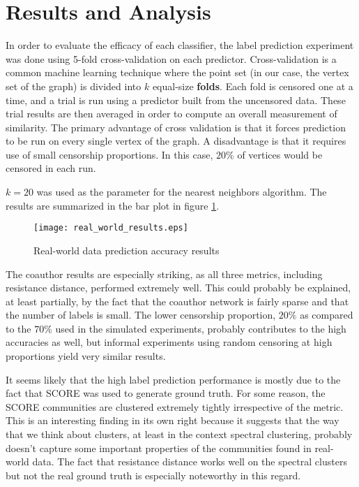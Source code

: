 \section{Results and Analysis}

In order to evaluate the efficacy of each classifier, the label prediction experiment was done using
5-fold cross-validation on each predictor. Cross-validation is a common machine learning technique
where the point set (in our case, the vertex set of the graph) is divided into $k$ equal-size
\textbf{folds}. Each fold is censored one at a time, and a trial is run using a predictor built from
the uncensored data. These trial results are then averaged in order to compute an overall
measurement of similarity. The primary advantage of cross validation is that it forces prediction to
be run on every single vertex of the graph. A disadvantage is that it requires use of small
censorship proportions. In this case, $20\%$ of vertices would be censored in each run.

$k=20$ was used as the parameter for the nearest neighbors algorithm. The results are summarized in
the bar plot in figure \ref{fig:real_world_results}.

\begin{figure}[H]
  \centering
  \texttt{[image: real\_world\_results.eps]}
  \caption{Real-world data prediction accuracy results}
  \label{fig:real_world_results}
\end{figure}

The coauthor results are especially striking, as all three metrics, including resistance distance,
performed extremely well. This could probably be explained, at least partially, by the fact that the
coauthor network is fairly sparse and that the number of labels is small. The lower censorship
proportion, $20\%$ as compared to the $70\%$ used in the simulated experiments, probably contributes
to the high accuracies as well, but informal experiments using random censoring at high proportions
yield very similar results.

It seems likely that the high label prediction performance is mostly due to the fact that SCORE was
used to generate ground truth. For some reason, the SCORE communities are clustered extremely
tightly irrespective of the metric. This is an interesting finding in its own right because it
suggests that the way that we think about clusters, at least in the context spectral clustering,
probably doesn't capture some important properties of the communities found in real-world data. The
fact that resistance distance works well on the spectral clusters but not the real ground truth is
especially noteworthy in this regard.

